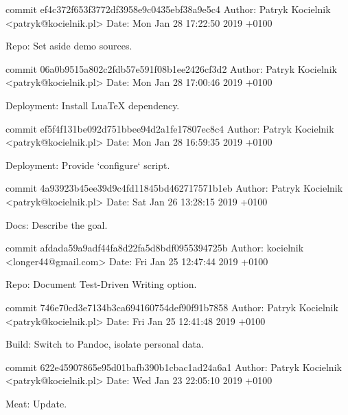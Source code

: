 commit ef4c372f653f3772df3958e9c0435ebf38a9e5c4
Author: Patryk Kocielnik <patryk@kocielnik.pl>
Date:   Mon Jan 28 17:22:50 2019 +0100

    Repo: Set aside demo sources.

commit 06a0b9515a802c2fdb57e591f08b1ee2426cf3d2
Author: Patryk Kocielnik <patryk@kocielnik.pl>
Date:   Mon Jan 28 17:00:46 2019 +0100

    Deployment: Install LuaTeX dependency.

commit ef5f4f131be092d751bbee94d2a1fe17807ec8c4
Author: Patryk Kocielnik <patryk@kocielnik.pl>
Date:   Mon Jan 28 16:59:35 2019 +0100

    Deployment: Provide `configure` script.

commit 4a93923b45ee39d9c4fd11845bd462717571b1eb
Author: Patryk Kocielnik <patryk@kocielnik.pl>
Date:   Sat Jan 26 13:28:15 2019 +0100

    Docs: Describe the goal.

commit afdada59a9adf44fa8d22fa5d8bdf0955394725b
Author: kocielnik <longer44@gmail.com>
Date:   Fri Jan 25 12:47:44 2019 +0100

    Repo: Document Test-Driven Writing option.

commit 746e70cd3e7134b3ca694160754def90f91b7858
Author: Patryk Kocielnik <patryk@kocielnik.pl>
Date:   Fri Jan 25 12:41:48 2019 +0100

    Build: Switch to Pandoc, isolate personal data.

commit 622e45907865e95d01bafb390b1cbac1ad24a6a1
Author: Patryk Kocielnik <patryk@kocielnik.pl>
Date:   Wed Jan 23 22:05:10 2019 +0100

    Meat: Update.
